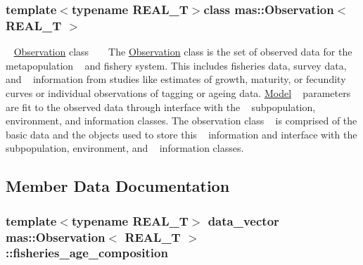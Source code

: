 \subsubsection*{template$<$typename R\+E\+A\+L\+\_\+\+T$>$class mas\+::\+Observation$<$ R\+E\+A\+L\+\_\+\+T $>$}

~\newline
 \hyperlink{classmas_1_1_observation}{Observation} class ~\newline
 ~\newline
 The \hyperlink{classmas_1_1_observation}{Observation} class is the set of observed data for the metapopulation ~\newline
 and fishery system. This includes fisheries data, survey data, and ~\newline
 information from studies like estimates of growth, maturity, or fecundity ~\newline
 curves or individual observations of tagging or ageing data. \hyperlink{classmas_1_1_model}{Model} ~\newline
 parameters are fit to the observed data through interface with the ~\newline
 subpopulation, environment, and information classes. The observation class ~\newline
 is comprised of the basic data and the objects used to store this ~\newline
 information and interface with the subpopulation, environment, and ~\newline
 information classes. 

\subsection{Member Data Documentation}
\hypertarget{classmas_1_1_observation_a58d075ce10fa51dbf4f93ddb3ca7920e}{}
\subsubsection[{fisheries\+\_\+age\+\_\+composition}]{\setlength{\rightskip}{0pt plus 5cm}template$<$typename R\+E\+A\+L\+\_\+\+T$>$ data\+\_\+vector {\bf mas\+::\+Observation}$<$ R\+E\+A\+L\+\_\+\+T $>$\+::fisheries\+\_\+age\+\_\+composition}\label{classmas_1_1_observation_a58d075ce10fa51dbf4f93ddb3ca7920e}
\hypertarget{classmas_1_1_observation_ace6a30e80477280a5f6f18b79761fb93}{}
